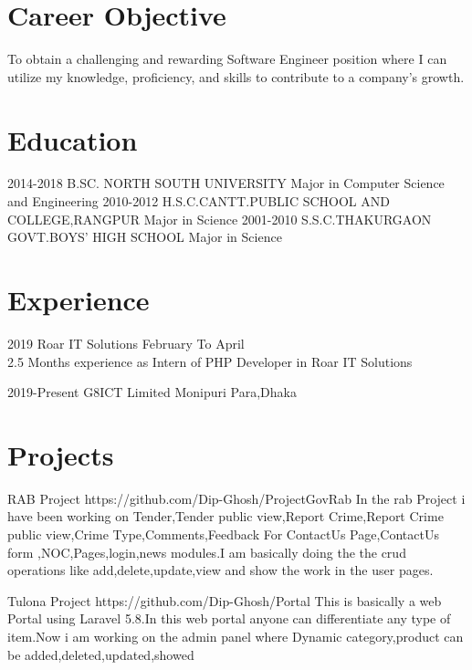 \documentclass[]{cv-style}
\begin{document}
\section{Career Objective}
To obtain a challenging and rewarding Software Engineer position where I can utilize my knowledge, proficiency, and skills to contribute to a company's growth.
\section{Education}
\begin{entrylist}
  \entry
    {2014-2018} 
    {B.SC. NORTH SOUTH UNIVERSITY}
    {Major in Computer Science and Engineering}
    {}
  \entry
    {2010-2012}
    {H.S.C.CANTT.PUBLIC SCHOOL AND COLLEGE,RANGPUR}
    {Major in Science}
        {}
  \entry
    {2001-2010}
    {S.S.C.THAKURGAON GOVT.BOYS' HIGH SCHOOL}
    {Major in Science}
     {}


\end{entrylist}
\section{Experience}
\begin{entrylist}
\entry
  {2019}
  {Roar IT Solutions}
  {February To April}
  {\\
  2.5 Months experience as Intern of PHP Developer in Roar IT Solutions}
  
\entry
  {2019-Present}
  {G8ICT Limited}
  {Monipuri Para,Dhaka}
  {}

\end{entrylist}
\section{Projects}
\begin{entrylist}
\entry
{}
{RAB Project}
{{https://github.com/Dip-Ghosh/ProjectGovRab}}
{In the rab Project i have been working on Tender,Tender public view,Report Crime,Report Crime public view,Crime Type,Comments,Feedback For ContactUs Page,ContactUs form ,NOC,Pages,login,news modules.I am basically doing the the crud operations like add,delete,update,view and show the work in the user pages.}
~
\end{entrylist}
\begin{entrylist}
\entry
{}
{Tulona Project }
{{https://github.com/Dip-Ghosh/Portal}}
{This is basically a web Portal using Laravel 5.8.In this web portal anyone can differentiate any type of item.Now i am working on the admin panel where Dynamic category,product can be added,deleted,updated,showed}

\end{entrylist}
\end{document}
